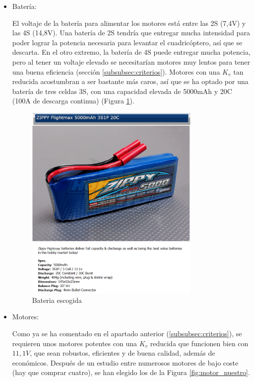 \documentclass[12pt,twoside]{article}
\begin{document}
			\begin{itemize}
			
				\item Batería:
				
				El voltaje de la batería para alimentar los motores está entre las 2S (7,4V) y las 4S (14,8V). Una batería de 2S tendría que entregar mucha intensidad para poder lograr la potencia necesaria para levantar el cuadricóptero, así que se descarta. En el otro extremo, la batería de 4S puede entregar mucha potencia, pero al tener un voltaje elevado se necesitarían motores muy lentos para tener una buena eficiencia (sección \ref{subsubsec:criterios}). Motores con una $K_{v}$ tan reducida acostumbran a ser bastante más caros, así que se ha optado por una batería de tres celdas 3S, con una capacidad elevada de 5000mAh y 20C (100A de descarga continua) (Figura \ref{fig:bateria_nuestra}).
								
			\begin{figure}
					\centering
					\includegraphics[width=0.8\textwidth]{Imatges/Componentes/bateria.png}
					\caption{Bateria escogida}
					\label{fig:bateria_nuestra}
			\end{figure}
									
				\item Motores:
				
				Como ya se ha comentado en el apartado anterior (\ref{subsubsec:criterios}), se requieren unos motores potentes con una $K_{v}$ reducida que funcionen bien con $11,1V$, que sean robustos, eficientes y de buena calidad, además de económicos. Después de un estudio entre numerosos motores de bajo coste (hay que comprar cuatro), se han elegido los de la Figura \ref{fig:motor_nuestro}.
				

\end{itemize}
\end{document}
